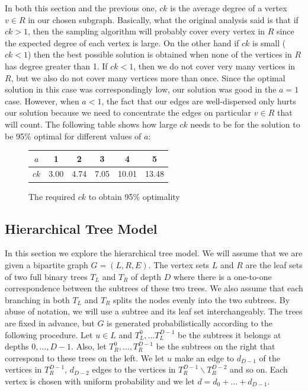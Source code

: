 \documentclass[11pt]{article}
\newcommand{\vs}{\vspace{0.2cm}}
\begin{document}
In both this section and the previous one, $ck$ is the average degree
of a vertex $v\in R$ in our chosen subgraph. Basically, what the
original analysis said is that if $ck>1$, then the sampling algorithm
will probably cover every vertex in $R$ since the expected degree of
each vertex is large. On the other hand if $ck$ is small ($ck < 1$)
then the best possible solution is obtained when none of the vertices
in $R$ has degree greater than 1. If $ck<1$, then we do not cover very
many vertices in $R$, but we also do not cover many vertices more than
once. Since the optimal solution in this case was correspondingly low,
our solution was good in the $a=1$ case. However, when $a<1$, the fact
that our edges are well-dispersed only hurts our solution because we
need to concentrate the edges on particular $v\in R$ that will
count. The following table shows how large $ck$ needs to be for the
solution to be 95\% optimal for different values of $a$:

\begin{figure}[h]
  \centering
  \begin{tabular}{ |c|c|c|c|c|c| }
    \hline
    $a$ & 1 & 2 & 3 & 4 & 5 \\ \hline
    $ck$ & 3.00 & 4.74 & 7.05 & 10.01 & 13.48 \\
    \hline
  \end{tabular}
  \caption{The required $ck$ to obtain 95\% optimality}
\end{figure}

\subsection{Hierarchical Tree Model}
\label{hierarchy}
In this section we explore the hierarchical tree model. We will assume
that we are given a bipartite graph $G=(L,R,E)$. The vertex sets $L$
and $R$ are the leaf sets of two full binary trees $T_L$ and $T_R$ of
depth $D$ where there is a one-to-one correspondence between the
subtrees of these two trees. We also assume that each branching in
both $T_L$ and $T_R$ splits the nodes evenly into the two
subtrees. By abuse of notation, we will use a subtree and its leaf set
interchangeably. The trees are fixed in advance, but $G$ is generated
probabilistically according to the following procedure. Let $u\in L$
and $T_L^0, \ldots T^{D-1}_L$ be the subtrees it belongs at depths
$0,\ldots, D-1$. Also, let $T_R^0,\ldots, T_R^{D-1}$ be the subtrees
on the right that correspond to these trees on the left. We let $u$
make an edge to $d_{D-1}$ of the vertices in $T_{R}^{D-1}$, $d_{D-2}$
edges to the vertices in $T_{R}^{D-1} \backslash T_{R}^{D-2}$ and so
on. Each vertex is chosen with uniform probability and we let $d =
d_{0} + \ldots + d_{D-1}$.\vs
\end{document}
